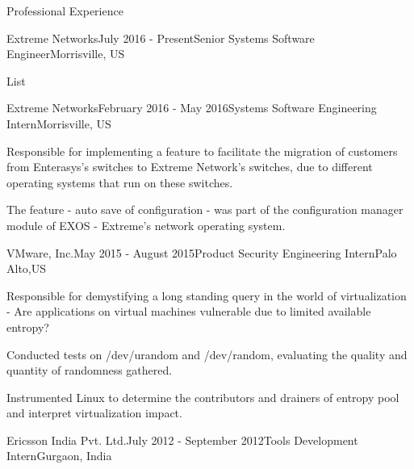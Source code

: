 \documentclass{resume} %
\begin{document}
\begin{rSection}{Professional Experience}
	\begin{rSubsectionEmployment}{Extreme Networks}{July 2016 - Present}{Senior Systems Software Engineer}{Morrisville, US}
    \item List
	\end{rSubsectionEmployment}
	\begin{rSubsectionEmployment}{Extreme Networks}{February 2016 - May 2016}{Systems Software Engineering Intern}{Morrisville, US}
    \item Responsible for implementing a feature to facilitate the migration of customers from Enterasys's switches to Extreme Network's switches, due to different operating systems that run on these switches.
	\item The feature - auto save of configuration - was part of the configuration manager module of EXOS - Extreme's network operating system.
	\end{rSubsectionEmployment}

	\begin{rSubsectionEmployment}{VMware, Inc.}{May 2015 - August 2015}{Product Security Engineering Intern}{Palo Alto,US}
	\item Responsible for demystifying a long standing query in the world of
virtualization - Are applications on virtual machines vulnerable due to limited available entropy?
  	\item Conducted tests on /dev/urandom and /dev/random, evaluating the quality and quantity of randomness gathered.
    \item Instrumented Linux to determine the contributors and drainers of entropy pool and interpret virtualization impact.
	\end{rSubsectionEmployment}
    \begin{rSubsectionEmploymentSimple}{Ericsson India Pvt. Ltd.}{July 2012 - September 2012}{Tools Development Intern}{Gurgaon, India}
   	\end{rSubsectionEmploymentSimple}
    
\end{rSection}
\end{document}
